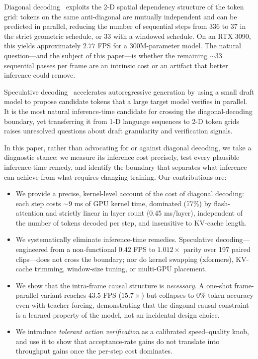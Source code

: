 \documentclass[10pt, twocolumn]{article}
\begin{document}
Diagonal decoding~\cite{mineworld} exploits the 2-D spatial dependency structure of the token grid: tokens on the same anti-diagonal are mutually independent and can be predicted in parallel, reducing the number of sequential steps from 336 to 37 in the strict geometric schedule, or 33 with a windowed schedule. On an RTX 3090, this yields approximately $2.77$ FPS for a 300M-parameter model. The natural question---and the subject of this paper---is whether the remaining $\sim$33 sequential passes per frame are an intrinsic cost or an artifact that better inference could remove.

Speculative decoding~\cite{leviathan2023fast,chen2023accelerating} accelerates autoregressive generation by using a small draft model to propose candidate tokens that a large target model verifies in parallel. It is the most natural inference-time candidate for crossing the diagonal-decoding boundary, yet transferring it from 1-D language sequences to 2-D token grids raises unresolved questions about draft granularity and verification signals.

In this paper, rather than advocating for or against diagonal decoding, we take a diagnostic stance: we measure its inference cost precisely, test every plausible inference-time remedy, and identify the boundary that separates what inference can achieve from what requires changing training. Our contributions are:

\begin{itemize}[leftmargin=1.4em, itemsep=1pt, topsep=2pt]
  \item We provide a precise, kernel-level account of the cost of diagonal decoding: each step costs $\sim$9 ms of GPU kernel time, dominated (77\%) by flash-attention and strictly linear in layer count (0.45 ms/layer), independent of the number of tokens decoded per step, and insensitive to KV-cache length.
  \item We systematically eliminate inference-time remedies. Speculative decoding---engineered from a non-functional $0.42$ FPS to $1.012\times$ parity over 197 paired clips---does not cross the boundary; nor do kernel swapping (xformers), KV-cache trimming, window-size tuning, or multi-GPU placement.
  \item We show that the intra-frame causal structure is \emph{necessary}. A one-shot frame-parallel variant reaches $43.5$ FPS ($15.7\times$) but collapses to $0\%$ token accuracy even with teacher forcing, demonstrating that the diagonal causal constraint is a learned property of the model, not an incidental design choice.
  \item We introduce \emph{tolerant action verification} as a calibrated speed--quality knob, and use it to show that acceptance-rate gains do not translate into throughput gains once the per-step cost dominates.
\end{itemize}
\end{document}
